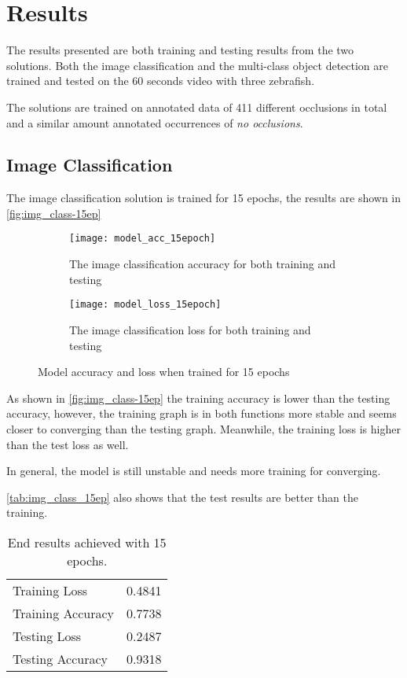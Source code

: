 \graphicspath{{figures/results/}}
\chapter{Results}
The results presented are both training and testing results from the two solutions. Both the image classification and the multi-class object detection are trained and tested on the 60 seconds video with three zebrafish.

The solutions are trained on annotated data of 411 different occlusions in total and a similar amount annotated occurrences of \textit{no occlusions}.

\section{Image Classification}
The image classification solution is trained for 15 epochs, the results are shown in \autoref{fig:img_class-15ep}
\begin{figure}[H]
	\centering
	\begin{subfigure}{0.48\textwidth}
		\texttt{[image: model\_acc\_15epoch]}
		\caption{The image classification accuracy for both training and testing}
		\label{fig:img_acc-15}
	\end{subfigure}
	\begin{subfigure}{0.48\textwidth}
		\texttt{[image: model\_loss\_15epoch]}
		\caption{The image classification loss for both training and testing}
		\label{fig:img_loss-15}
	\end{subfigure}
\caption{Model accuracy and loss when trained for 15 epochs}
\label{fig:img_class-15ep}
\end{figure}

As shown in \autoref{fig:img_class-15ep} the training accuracy is lower than the testing accuracy, however, the training graph is in both functions more stable and seems closer to converging than the testing graph. Meanwhile, the training loss is  higher than the test loss as well.

In general, the model is still unstable and needs more training for converging.

\autoref{tab:img_class_15ep} also shows that the test results are better than the training.
\begin{table}[H]
	\centering
	\caption{End results achieved with 15 epochs.}
	\begin{tabular}{|l|l|}
		\hline
		Training Loss                	& 0.4841 			\\\rowcolor{lightGrey}\hline
		Training Accuracy       	    & 0.7738 			\\ \hline
		Testing Loss     				& 0.2487 			\\\rowcolor{lightGrey}\hline
		Testing Accuracy 				& 0.9318			\\ \hline
	\end{tabular}
\label{tab:img_class_15ep}
\end{table}

